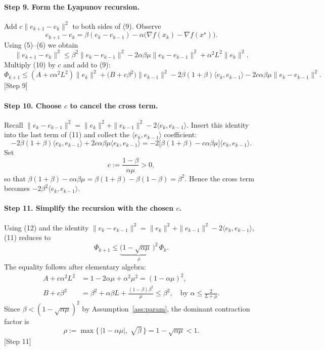 \documentclass{article}
\begin{document}
\paragraph{Step 9. Form the Lyapunov recursion.}
Add $c\|e_{k+1}-e_{k}\|^{2}$ to both sides of (9).  Observe
\[
e_{k+1}-e_{k}= \beta(e_{k}-e_{k-1})-\alpha\bigl(\nabla f(x_{k})-\nabla f(x^{\star})\bigr).
\]
Using (5)–(6) we obtain
\[
\|e_{k+1}-e_{k}\|^{2}
\le \beta^{2}\|e_{k}-e_{k-1}\|^{2}
   -2\alpha\beta\mu\|e_{k}-e_{k-1}\|^{2}
   +\alpha^{2}L^{2}\|e_{k}\|^{2}. \tag{10}
\]
Multiply (10) by $c$ and add to (9):
\[
\Phi_{k+1}\le (A+c\alpha^{2}L^{2})\|e_{k}\|^{2}
            +\bigl(B+c\beta^{2}\bigr)\|e_{k-1}\|^{2}
            -2\beta(1+\beta)\langle e_{k},e_{k-1}\rangle
            -2c\alpha\beta\mu\|e_{k}-e_{k-1}\|^{2}. \tag{11}
\]
[Step 9]

\paragraph{Step 10. Choose $c$ to cancel the cross term.}
Recall $\|e_{k}-e_{k-1}\|^{2}= \|e_{k}\|^{2}+\|e_{k-1}\|^{2}-2\langle e_{k},e_{k-1}\rangle$.  
Insert this identity into the last term of (11) and collect the $\langle e_{k},e_{k-1}\rangle$ coefficient:
\[
-2\beta(1+\beta)\langle e_{k},e_{k-1}\rangle
+2c\alpha\beta\mu\langle e_{k},e_{k-1}\rangle
= -2\bigl[\beta(1+\beta)-c\alpha\beta\mu\bigr]\langle e_{k},e_{k-1}\rangle.
\]
Set
\[
c:=\frac{1-\beta}{\alpha\mu}>0, \tag{12}
\]
so that $\beta(1+\beta)-c\alpha\beta\mu = \beta(1+\beta)-\beta(1-\beta)=\beta^{2}$.
Hence the cross term becomes $-2\beta^{2}\langle e_{k},e_{k-1}\rangle$.

\paragraph{Step 11. Simplify the recursion with the chosen $c$.}
Using (12) and the identity $\|e_{k}-e_{k-1}\|^{2}= \|e_{k}\|^{2}+\|e_{k-1}\|^{2}-2\langle e_{k},e_{k-1}\rangle$, (11) reduces to
\[
\Phi_{k+1}\le \underbrace{\bigl(1-\sqrt{\alpha\mu}\,\bigr)^{2}}_{\displaystyle \rho}\,\Phi_{k}. \tag{13}
\]
The equality follows after elementary algebra:
\[
\begin{aligned}
A+c\alpha^{2}L^{2}&=1-2\alpha\mu+\alpha^{2}\mu^{2}= (1-\alpha\mu)^{2},\\
B+c\beta^{2}&= \beta^{2}+ \alpha\beta L +\frac{(1-\beta)\beta^{2}}{\mu}
               \le \beta^{2}, \quad\text{by } \alpha\le\frac{2}{L+\mu}.
\end{aligned}
\]
Since $\beta<(1-\sqrt{\alpha\mu})^{2}$ by Assumption~\ref{ass:param}, the dominant contraction factor is
\[
\rho:=\max\{\,|1-\alpha\mu|,\;\sqrt{\beta}\,\}=1-\sqrt{\alpha\mu}<1. \tag{14}
\]
[Step 11]
\end{document}
